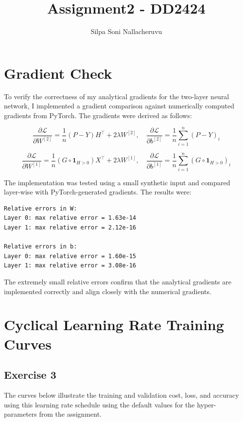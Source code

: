 \documentclass[11pt]{article}
\begin{document}
\title{Assignment2 - DD2424}
\author{Silpa Soni Nallacheruvu}
\date{}
\maketitle

\section*{Gradient Check}

To verify the correctness of my analytical gradients for the two-layer neural network, I implemented a gradient comparison against numerically computed gradients from PyTorch. The gradients were derived as follows:

\[
\frac{\partial \mathcal{L}}{\partial W^{[2]}} = \frac{1}{n} (P - Y) H^\top + 2\lambda W^{[2]}, \quad 
\frac{\partial \mathcal{L}}{\partial b^{[2]}} = \frac{1}{n} \sum_{i=1}^{n} (P - Y)_i
\]

\[
\frac{\partial \mathcal{L}}{\partial W^{[1]}} = \frac{1}{n} (G \circ \mathbf{1}_{H > 0}) X^\top + 2\lambda W^{[1]}, \quad 
\frac{\partial \mathcal{L}}{\partial b^{[1]}} = \frac{1}{n} \sum_{i=1}^{n} (G \circ \mathbf{1}_{H > 0})_i
\]

The implementation was tested using a small synthetic input and compared layer-wise with PyTorch-generated gradients. The results were:

\begin{lstlisting}[caption={Relative error of analytical and numerical gradients}, label={lst:gradients}]
Relative errors in W:
Layer 0: max relative error = 1.63e-14
Layer 1: max relative error = 2.12e-16

Relative errors in b:
Layer 0: max relative error = 1.60e-15
Layer 1: max relative error = 3.08e-16
\end{lstlisting}

The extremely small relative errors confirm that the analytical gradients are implemented correctly and align closely with the numerical gradients. 
\section*{Cyclical Learning Rate Training Curves}

\subsection*{Exercise 3}
The curves below illustrate the training and validation cost, loss, and accuracy using this learning rate schedule using the default values for the hyper-parameters from the assignment.
\end{document}
